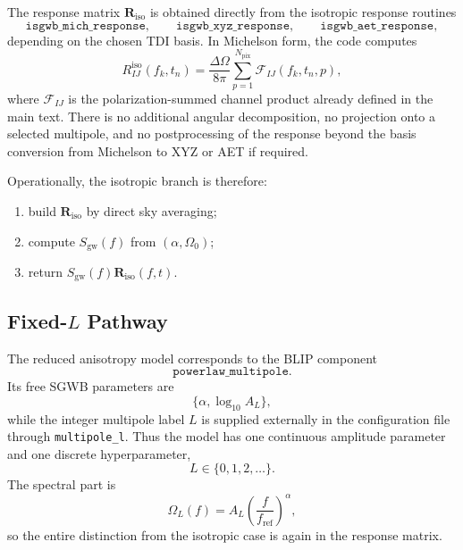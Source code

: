 \documentclass[11pt]{article}
\begin{document}
The response matrix \(\mathbf{R}_{\mathrm{iso}}\) is obtained directly from the isotropic response routines
\begin{equation}
\texttt{isgwb\_mich\_response},\qquad
\texttt{isgwb\_xyz\_response},\qquad
\texttt{isgwb\_aet\_response},
\end{equation}
depending on the chosen TDI basis. In Michelson form, the code computes
\begin{equation}
R^{\mathrm{iso}}_{IJ}(f_k,t_n)
=\frac{\Delta\Omega}{8\pi}\sum_{p=1}^{N_{\mathrm{pix}}}
\mathcal{F}_{IJ}(f_k,t_n,p),
\end{equation}
where \(\mathcal{F}_{IJ}\) is the polarization-summed channel product already defined in the main text. There is no additional angular decomposition, no projection onto a selected multipole, and no postprocessing of the response beyond the basis conversion from Michelson to XYZ or AET if required.

Operationally, the isotropic branch is therefore:
\begin{enumerate}
\item build \(\mathbf{R}_{\mathrm{iso}}\) by direct sky averaging;
\item compute \(S_{\mathrm{gw}}(f)\) from \((\alpha,\Omega_0)\);
\item return \(S_{\mathrm{gw}}(f)\mathbf{R}_{\mathrm{iso}}(f,t)\).
\end{enumerate}

\subsection{Fixed-\texorpdfstring{$L$}{L} Pathway}
The reduced anisotropy model corresponds to the BLIP component
\begin{equation}
\texttt{powerlaw\_multipole}.
\end{equation}
Its free SGWB parameters are
\begin{equation}
\{\alpha,\log_{10}A_L\},
\end{equation}
while the integer multipole label \(L\) is supplied externally in the configuration file through \texttt{multipole\_l}. Thus the model has one continuous amplitude parameter and one discrete hyperparameter,
\begin{equation}
L\in\{0,1,2,\dots\}.
\end{equation}
The spectral part is
\begin{equation}
\Omega_{L}(f)=A_L\left(\frac{f}{f_{\mathrm{ref}}}\right)^\alpha,
\end{equation}
so the entire distinction from the isotropic case is again in the response matrix.
\end{document}
